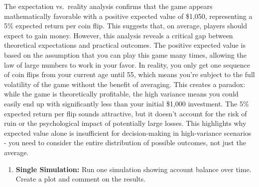 \documentclass[
  letterpaper,
  DIV=11,
  numbers=noendperiod]{scrartcl}
\providecommand{\tightlist}{%
  \setlength{\itemsep}{0pt}\setlength{\parskip}{0pt}}
\begin{document}
The expectation vs.~reality analysis confirms that the game appears
mathematically favorable with a positive expected value of \$1,050,
representing a 5\% expected return per coin flip. This suggests that, on
average, players should expect to gain money. However, this analysis
reveals a critical gap between theoretical expectations and practical
outcomes. The positive expected value is based on the assumption that
you can play this game many times, allowing the law of large numbers to
work in your favor. In reality, you only get one sequence of coin flips
from your current age until 55, which means you're subject to the full
volatility of the game without the benefit of averaging. This creates a
paradox: while the game is theoretically profitable, the high variance
means you could easily end up with significantly less than your initial
\$1,000 investment. The 5\% expected return per flip sounds attractive,
but it doesn't account for the risk of ruin or the psychological impact
of potentially large losses. This highlights why expected value alone is
insufficient for decision-making in high-variance scenarios - you need
to consider the entire distribution of possible outcomes, not just the
average.

\begin{enumerate}
\def\labelenumi{\arabic{enumi}.}
\setcounter{enumi}{2}
\tightlist
\item
  \textbf{Single Simulation:} Run one simulation showing account balance
  over time. Create a plot and comment on the results.
\end{enumerate}
\end{document}
